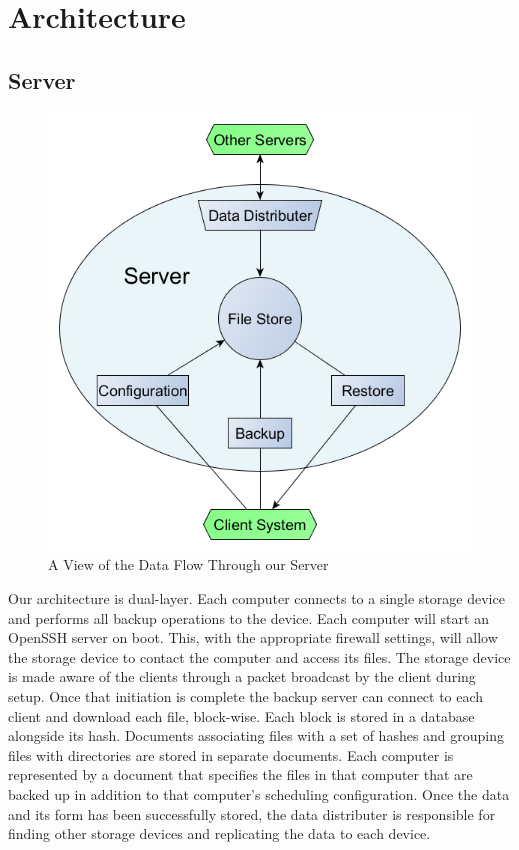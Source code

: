 \chapter{Architecture}
\section{Server}

\begin{figure}[hb]
\centering
\includegraphics[scale=0.5]{images/architechure-diagram2.png}
\caption{A View of the Data Flow Through our Server}
\end{figure}

Our architecture is dual-layer. Each computer connects to a single storage
device and performs all backup operations to the device. Each computer will start
an OpenSSH server on boot. This, with the appropriate firewall settings, will
allow the storage device to contact the computer and access its files. The
storage device is made aware of the clients through a packet broadcast by the
client during setup. Once that initiation is complete the backup server can
connect to each client and download each file, block-wise. Each block is stored
in a database alongside its hash.
Documents associating files with a set of hashes and grouping files with
directories are stored in separate documents. Each computer is represented by a
document that specifies the files in that computer that are backed up in
addition to that computer's scheduling configuration. Once the data and its form
has been successfully stored, the data distributer is responsible for
finding other storage devices and replicating the data to each device.

